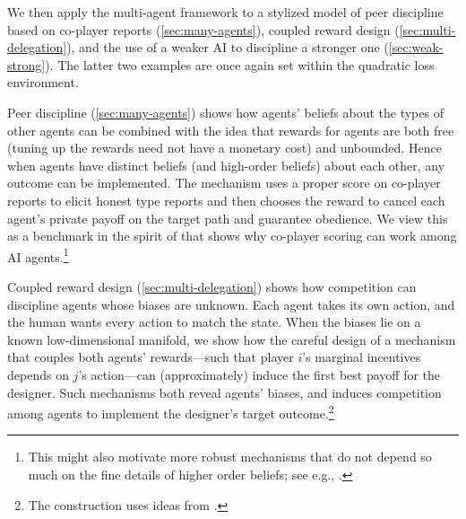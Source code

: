 \documentclass[12pt,reqno]{article}
\theoremstyle{definition} \newtheorem{example}{Example}
\theoremstyle{definition} \newtheorem{condition}{Condition}
\theoremstyle{definition} \newtheorem{corollary}{Corollary}
\theoremstyle{definition} \newtheorem{claim}{Claim}
\theoremstyle{definition} \newtheorem{definition}{Definition}
\theoremstyle{definition} \newtheorem{conjecture}{Conjecture}
\theoremstyle{definition} \newtheorem{Lemma}{Lemma}
\theoremstyle{definition} \newtheorem{lemma}{Lemma}
\theoremstyle{plain} \newtheorem{theorem}{Theorem}
\theoremstyle{definition} \newtheorem{assumption}{Assumption}
\theoremstyle{definition} \newtheorem*{assumptionnonumber}{Assumption}
\theoremstyle{definition} \newtheorem*{theoremNoNumber}{Proposition}
\theoremstyle{definition}\newtheorem{proposition}{Proposition}
\theoremstyle{definition} \newtheorem{observation}{Observation}
\theoremstyle{definition} \newtheorem*{definitionNoNumber}{Definition}
\theoremstyle{definition} \newtheorem{Definition}{Definition}
\theoremstyle{definition} \newtheorem*{DefinitionNoNumber}{Definition}
\theoremstyle{definition} \newtheorem*{fact}{Fact}
\theoremstyle{definition} \newtheorem*{property}{Property}
\theoremstyle{definition} \newtheorem{remark}{Remark}
\theoremstyle{definition}\newtheorem{romanexampleinner}{Example}
\begin{document}
We then apply the multi-agent framework to a stylized model of peer discipline based on co-player reports (\cref{sec:many-agents}), coupled reward design (\cref{sec:multi-delegation}), and the use of a weaker AI to discipline a stronger one (\cref{sec:weak-strong}). The latter two examples are once again set within the quadratic loss environment. 

Peer discipline (\cref{sec:many-agents}) shows how agents' beliefs about the types of other agents can be combined with the idea that rewards for agents are both free (tuning up the rewards need not have a monetary cost) and unbounded. Hence when agents have distinct beliefs (and high-order beliefs) about each other, any outcome can be implemented.  The mechanism uses a proper score on co-player reports to elicit honest type reports and then chooses the reward to cancel each agent's private payoff on the target path and guarantee obedience. We view this as a benchmark in the spirit of \cite{cremer1988full} that shows why co-player scoring can work among AI agents.\footnote{This might also motivate more robust mechanisms that do not depend so much on the fine details of higher order beliefs; see e.g., \cite{bergemann2005robust}.} 

Coupled reward design (\cref{sec:multi-delegation}) shows how competition can discipline agents whose biases are unknown. Each agent takes its own action, and the human wants every action to match the state. When the biases lie on a known low-dimensional manifold, we show how the careful design of a mechanism that couples both agents' rewards---such that player $i$'s marginal incentives depends on $j$'s action---can (approximately) induce the first best payoff for the designer. Such mechanisms both reveal agents' biases, and induces competition among agents to implement the designer's target outcome.\footnote{The construction uses ideas from \cite{koh2025prices}.} 
\end{document}

